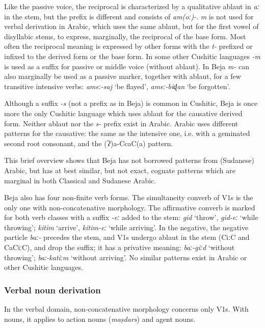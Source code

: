 \documentclass[output=paper]{langsci/langscibook}
\begin{document}
Like the passive voice, the reciprocal is characterized by a qualitative ablaut in \textit{aː} in the stem, but the prefix is different and consists of \textit{am(oː)-}. \textit{m} is not used for verbal derivation in Arabic, which uses the same ablaut, but for the first vowel of disyllabic stems, to express, marginally, the reciprocal of the base form. Most often the reciprocal meaning is expressed by other forms with the \textit{t-} prefixed or infixed to the derived form or the base form. In some other Cushitic languages \textit{\nobreakdash-m} is used as a suffix for passive or middle voice (without ablaut). In Beja \textit{m-} can also marginally be used as a passive marker, together with ablaut, for a few transitive intensive verbs: \textit{ameː\nobreakdash-saj} ‘be flayed’, \textit{ameː\nobreakdash-biɖan} ‘be forgotten’.

Although a suffix \textit{{}-s} (not a prefix as in Beja) is common in Cushitic, Beja is once more the only Cushitic language which uses ablaut for the causative derived form. Neither ablaut nor the \textit{s-} prefix exist in Arabic. Arabic uses different patterns for the causative: the same as the intensive one, i.e. with a geminated second root consonant, and the (Ɂ)a-CcaC(a) pattern.

This brief overview shows that Beja has not borrowed patterns from (Sudanese) Arabic, but has at best similar, but not exact, cognate patterns which are marginal in both Classical and Sudanese Arabic.

Beja also has four non-finite verb forms. The simultaneity converb of V1s is the only one with non-concatenative morphology. The affirmative converb is marked for both verb classes with a suffix \textit{{}-eː} added to the stem: \textit{gid} ‘throw’, \textit{gid\nobreakdash-eː} ‘while throwing’; \textit{kitim} ‘arrive’, \textit{kitim-eː} ‘while arriving’. In the negative, the negative particle \textit{baː-} precedes the stem, and V1s undergo ablaut in the stem (CiːC and CaCiːC), and drop the suffix; it has a privative meaning: \textit{baː-giːd} ‘without throwing’; \textit{baː-katiːm} ‘without arriving’. No similar patterns exist in Arabic or other Cushitic languages.


 \subsubsection{Verbal noun derivation}

In the verbal domain, non-concatenative morphology concerns only V1s. With nouns, it applies to action nouns (\textit{maṣdars}) and agent nouns.
\end{document}

